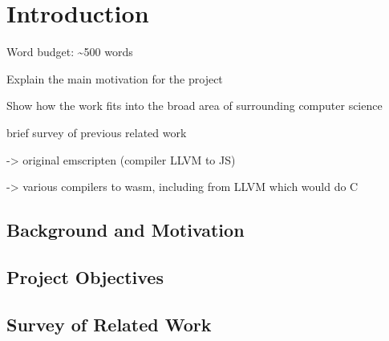 \documentclass[00-main.tex]{subfiles}
\begin{document}
\chapter{Introduction}

\begin{Comment}
Word budget: \textasciitilde 500 words
\end{Comment}

\begin{Comment}
Explain the main motivation for the project

Show how the work fits into the broad area of surrounding computer science

brief survey of previous related work

-> original emscripten (compiler LLVM to JS)

-> various compilers to wasm, including from LLVM which would do C
\end{Comment}

\section{Background and Motivation}

\section{Project Objectives}

\section{Survey of Related Work}
\end{document}
